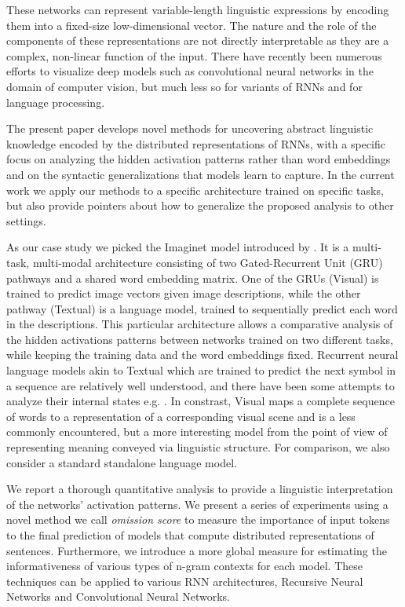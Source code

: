 These networks can represent variable-length linguistic expressions by
encoding them into a fixed-size low-dimensional vector. The nature and
the role of the components of these representations are not directly
interpretable as they are a complex, non-linear function of the
input. There have recently been numerous efforts to visualize deep
models such as convolutional neural networks in the domain of computer
vision, but much less so for variants of RNNs and for language
processing.
 
The present paper develops novel methods for uncovering abstract
linguistic knowledge encoded by the distributed representations of RNNs,
with a specific focus on analyzing the hidden activation patterns rather 
than word embeddings and on the syntactic generalizations 
that models learn to capture. In the current work we apply our methods
to a specific architecture trained on specific tasks, but also provide
pointers about how to generalize the proposed analysis to other settings.

As our case study we picked the {\sc Imaginet} model introduced by \label{explainimaginet}
. It is a multi-task, multi-modal
architecture consisting of two Gated-Recurrent Unit (GRU)
\cite{cho2014properties,chung2014empirical} pathways and
a shared word embedding matrix. One of the GRUs ({\sc Visual}) is
trained to predict image vectors given image descriptions, while the other
pathway ({\sc Textual}) is a language model, trained to sequentially predict each
word in the descriptions. This particular
architecture allows a comparative analysis of the hidden activations
patterns between networks trained on two different tasks, while
keeping the training data and the word embeddings fixed. Recurrent neural
language models akin to {\sc Textual} which are trained to predict the
next symbol in a sequence are relatively well understood, and there
have been some attempts to analyze their internal states e.g.
\cite{elman1991distributed,karpathy2015visualizing}. In
constrast, {\sc Visual} maps a complete sequence of words to
a representation of a corresponding visual scene and is a less
commonly encountered, but a more interesting model from the point of
view of representing meaning conveyed via linguistic structure.
For comparison, we also consider a standard standalone language model.

We report a thorough quantitative analysis to provide a linguistic 
interpretation of the networks' activation patterns. We present a 
series of experiments using a novel method we call \emph{omission score} 
to measure the importance of input tokens to the final prediction of models 
that compute distributed representations of sentences. 
Furthermore, we introduce a more global measure for estimating the 
informativeness of various types of n-gram contexts for each model.
These techniques can be applied to various RNN architectures, Recursive 
Neural Networks and Convolutional Neural Networks. 

